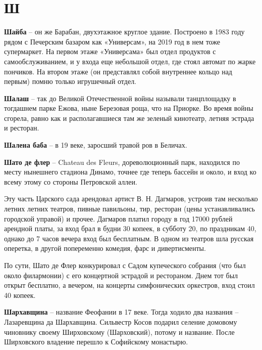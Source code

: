 \chapter*{Ш}

\textbf{Шайба} – он же Барабан, двухэтажное круглое здание. Построено в 1983 году рядом с Печерским базаром как «Универсам», на 2019 год в нем тоже супермаркет. На первом этаже «Универсама» был отдел продуктов с самообслуживанием, и у входа еще небольшой отдел, где стоял автомат по жарке пончиков. На втором этаже (он представлял собой внутреннее кольцо над первым) помню только игрушечный отдел.\\

\medskip

\textbf{Шалаш} – так до Великой Отечественной войны называли танцплощадку в тогдашнем парке Ежова, ныне Березовая роща, что на Приорке. Во время войны сгорела, равно как и располагавшиеся там же зеленый кинотеатр, летняя эстрада и ресторан.\\

\medskip

\textbf{Шалена баба} – в 19 веке, заросший травой ров в Беличах.\\

\medskip

\textbf{Шато де флер} – Chateau des Fleurs, дореволюционный парк, находился по месту нынешнего стадиона Динамо, точнее где теперь бассейн и около, и вход ко всему этому со стороны Петровской аллеи. 

Эту часть Царского сада арендовал артист В. Н. Дагмаров, устроив там несколько летних летних театров, пивные павильоны, тир, ресторан (цены устанавливались городской управой) и прочее. Дагмаров платил городу в год 17000 рублей арендной платы, за вход брал в будни 30 копеек, в субботу 20, по праздникам 40, однако до 7 часов вечера вход был бесплатным. В одном из театров шла русская оперетка, в другой попеременно комедия, фарс и дивертисменты.

По сути, Шато де Флер конкурировал с Садом купеческого собрания (что был около филармонии) с его концертной эстрадой и рестораном. Днем тот был открыт бесплатно, а вечером, на концерты симфонических оркестров, вход стоил 40 копеек.\\ 

\medskip

\textbf{Шархавщина} – название Феофании в 17 веке. Тогда ходило два названия – Лазаревщина да Шархавщина. Сильвестр Косов подарил селение домовому чиновнику своему Ширховскому (Шарховский), потому и название. После Ширховского владение перешло к Софийскому монастырю.\\

